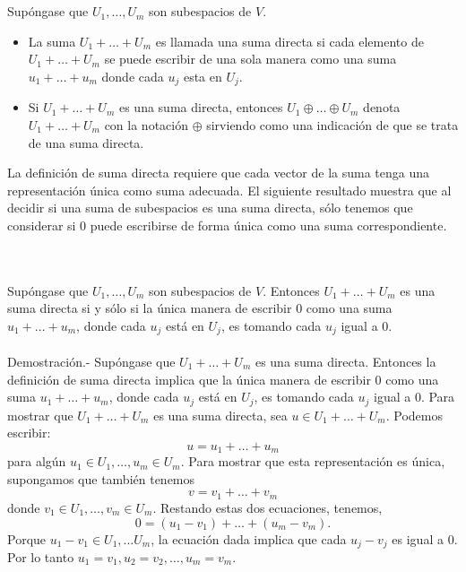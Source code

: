     \begin{mydef}\,\\\\
	Supóngase que $U_1,\ldots, U_m$ son subespacios de $V$.
	\begin{itemize}
	    \item La suma $U_1+\ldots + U_m$ es llamada una suma directa si cada elemento de $U_1+\ldots + U_m$ se puede escribir de una sola manera como una suma  $u_1 + \ldots + u_m$ donde cada $u_j$ esta en $U_j$.
	    \item Si $U_1 + \ldots + U_m$ es una suma directa, entonces $U_1 \oplus \ldots \oplus U_m$ denota $U_1 + \ldots + U_m$ con la notación $\oplus$ sirviendo como una indicación de que se trata de una suma directa.
	\end{itemize}
    \end{mydef}
\vspace{.5cm}

La definición de suma directa requiere que cada vector de la suma tenga una representación única como suma adecuada. El siguiente resultado muestra que al decidir si una suma de subespacios es una suma directa, sólo tenemos que considerar si 0 puede escribirse de forma única como una suma correspondiente.\\

\setcounter{myteo}{43}
\begin{myteo}\,\\\\
    Supóngase que $U_1,\ldots, U_m$ son subespacios de $V$. Entonces $U_1+\ldots + U_m$ es una suma directa si y sólo si la única manera de escribir $0$ como una suma $u_1 + \ldots + u_m$, donde cada $u_j$ está en $U_j$, es tomando cada $u_j$ igual a $0$.\\\\
	Demostración.-\; Supóngase que $U_1+\ldots + U_m$ es una suma directa. Entonces la definición de suma directa implica que la única manera de escribir $0$ como una suma $u_1 + \ldots + u_m$, donde cada $u_j$ está en $U_j$, es tomando cada $u_j$ igual a $0$. Para mostrar que $U_1 + \ldots + U_m$ es una suma directa, sea $u \in U_1 + \ldots + U_m$. Podemos escribir:
	$$u = u_1 + \ldots + u_m$$
	para algún $u_1 \in U_1 , \ldots, u_m \in U_m$. Para mostrar que esta representación es única, supongamos que también tenemos
	$$v = v_1 + \ldots + v_m$$
	donde $v_1 \in U_1,\ldots , v_m \in U_m$. Restando estas dos ecuaciones, tenemos,
	$$0=(u_1-v_1)+\ldots + (u_m - v_m).$$
	Porque $u_1-v_1\in U_1,\ldots U_m$, la ecuación dada implica que cada $u_j - v_j$ es igual a $0$. Por lo tanto $u_1 = v_1,u_2=v_2, \ldots , u_m = v_m$.
\end{myteo}
\vspace{.5cm}


